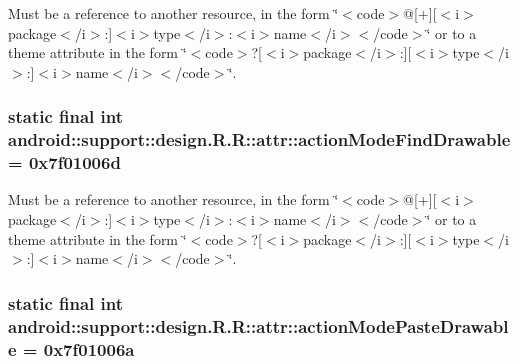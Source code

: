 Must be a reference to another resource, in the form \char`\"{}$<$code$>$@\mbox{[}+\mbox{]}\mbox{[}$<$i$>$package$<$/i$>$:\mbox{]}$<$i$>$type$<$/i$>$:$<$i$>$name$<$/i$>$$<$/code$>$\char`\"{} or to a theme attribute in the form \char`\"{}$<$code$>$?\mbox{[}$<$i$>$package$<$/i$>$:\mbox{]}\mbox{[}$<$i$>$type$<$/i$>$:\mbox{]}$<$i$>$name$<$/i$>$$<$/code$>$\char`\"{}. \hypertarget{classandroid_1_1support_1_1design_1_1_r_1_1attr_7d4b9c0664d6423cc2fca3eb0dba03ba}{
\subsubsection[{actionModeFindDrawable}]{\setlength{\rightskip}{0pt plus 5cm}static final int android::support::design.R.R::attr::actionModeFindDrawable = 0x7f01006d}}
\label{classandroid_1_1support_1_1design_1_1_r_1_1attr_7d4b9c0664d6423cc2fca3eb0dba03ba}


Must be a reference to another resource, in the form \char`\"{}$<$code$>$@\mbox{[}+\mbox{]}\mbox{[}$<$i$>$package$<$/i$>$:\mbox{]}$<$i$>$type$<$/i$>$:$<$i$>$name$<$/i$>$$<$/code$>$\char`\"{} or to a theme attribute in the form \char`\"{}$<$code$>$?\mbox{[}$<$i$>$package$<$/i$>$:\mbox{]}\mbox{[}$<$i$>$type$<$/i$>$:\mbox{]}$<$i$>$name$<$/i$>$$<$/code$>$\char`\"{}. \hypertarget{classandroid_1_1support_1_1design_1_1_r_1_1attr_c214c5313f2df0955325bcd8b9f57cd6}{
\subsubsection[{actionModePasteDrawable}]{\setlength{\rightskip}{0pt plus 5cm}static final int android::support::design.R.R::attr::actionModePasteDrawable = 0x7f01006a}}
\label{classandroid_1_1support_1_1design_1_1_r_1_1attr_c214c5313f2df0955325bcd8b9f57cd6}


